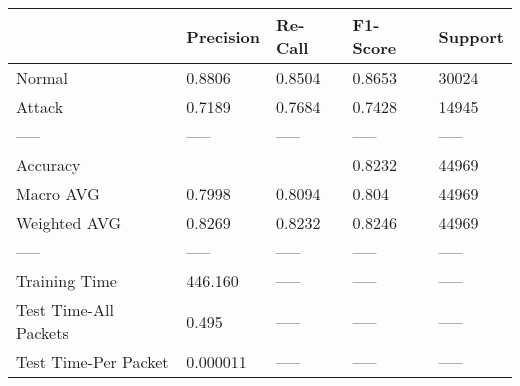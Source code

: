 \begin{tabular}{lllll}
\toprule
{} & Precision & Re-Call & F1-Score & Support \\
\midrule
Normal                &    0.8806 &  0.8504 &   0.8653 &   30024 \\
Attack                &    0.7189 &  0.7684 &   0.7428 &   14945 \\
-----                 &     ----- &   ----- &    ----- &   ----- \\
Accuracy              &           &         &   0.8232 &   44969 \\
Macro AVG             &    0.7998 &  0.8094 &    0.804 &   44969 \\
Weighted AVG          &    0.8269 &  0.8232 &   0.8246 &   44969 \\
-----                 &     ----- &   ----- &    ----- &   ----- \\
Training Time         &   446.160 &   ----- &    ----- &   ----- \\
Test Time-All Packets &     0.495 &   ----- &    ----- &   ----- \\
Test Time-Per Packet  &  0.000011 &   ----- &    ----- &   ----- \\
\bottomrule
\end{tabular}
